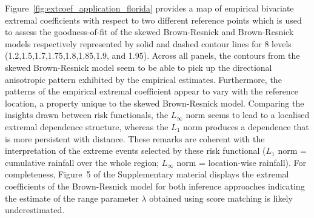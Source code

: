 \documentclass[12pt]{article}
\begin{document}
%
Figure~\ref{fig:extcoef_application_florida} provides a map of empirical bivariate extremal coefficients with respect to two different reference points which is used to assess the goodness-of-fit of the skewed Brown-Resnick and Brown-Resnick models respectively represented by solid and dashed contour lines for 8 levels (1.2,1.5,1.7,1.75,1.8,1.85,1.9, and 1.95). Across all panels, the contours from the skewed Brown-Resnick model seem to be able to pick up the directional anisotropic pattern exhibited by the empirical estimates. 
Furthermore, the patterns of the empirical extremal coefficient appear to vary with the reference location, a property unique to the skewed Brown-Resnick model.
%
Comparing the insights drawn between risk functionals, the $L_\infty$ norm seems to lead to a localised extremal dependence structure, whereas the $L_1$ norm produces a dependence that is more persistent with distance. These remarks are coherent with the interpretation of the extreme events selected by these risk functional ($L_1$ norm  = cumulative rainfall over the whole region; $L_\infty$ norm  = location-wise rainfall). 
%
For completeness, Figure~5 of the Supplementary material displays the extremal coefficients of the Brown-Resnick model for both inference approaches indicating the estimate of the range parameter $\lambda$ obtained using score matching is likely underestimated. 
%
\end{document}
